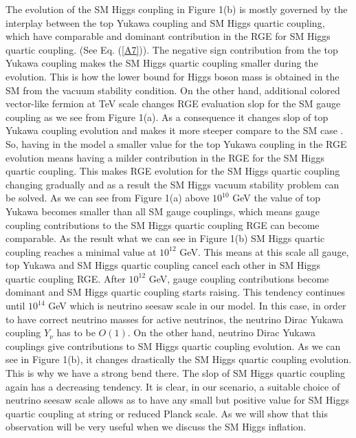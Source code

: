 \documentclass[aps,prd,preprint,superscriptaddress,showpacs,ctexart]{revtex4-1}
\begin{document}
The evolution of the SM Higgs coupling in Figure 1(b) is mostly governed
by the interplay between the top Yukawa coupling and SM Higgs quartic
coupling, which have comparable and dominant contribution in the RGE
for SM Higgs quartic coupling. (See Eq. (\ref{A7})). The negative
sign contribution from the top Yukawa coupling makes the SM Higgs quartic
coupling smaller during the evolution. This is how the lower bound
for Higgs boson mass is obtained in the SM from the vacuum stability
condition. On the other hand, additional colored vector-like fermion
at TeV scale changes RGE evaluation slop for the SM gauge coupling
as we see from Figure 1(a). As a consequence it changes slop of top
Yukawa coupling evolution and makes it more steeper compare to the
SM case \cite{Gogoladze:2010in}. So, having in the model a smaller
value for the top Yukawa coupling in the RGE evolution means having
a milder contribution in the RGE for the SM Higgs quartic coupling.
This makes RGE evolution for the SM Higgs quartic coupling 
changing gradually and as a result the SM Higgs vacuum stability problem
can be solved. As we can see from Figure 1(a) above $10^{10}$ GeV
the value of top Yukawa becomes smaller than all SM gauge couplings,
which means gauge coupling contributions to the SM Higgs quartic coupling
RGE can become comparable. As the result what we can see in Figure
1(b) SM Higgs quartic coupling reaches a minimal value at $10^{12}$
GeV. This means at this scale all gauge, top Yukawa and SM Higgs quartic
coupling cancel each other in SM Higgs quartic coupling RGE. After
$10^{12}$ GeV, gauge coupling contributions become dominant and SM
Higgs quartic coupling starts raising. This tendency continues until
$10^{14}$ GeV which is neutrino seesaw scale in our model. In this
case, in order to have correct neutrino masses for active neutrinos,
the neutrino Dirac Yukawa coupling $Y_{\nu}$ has to be $O(1)$. On
the other hand, neutrino Dirac Yukawa couplings give contributions
to SM Higgs quartic coupling evolution. As we can see in Figure
1(b), it changes drastically the SM Higgs quartic coupling evolution.
This is why we have a strong bend there. The slop of SM Higgs quartic
coupling again has a decreasing tendency. It is clear, in our scenario,
 a suitable choice of neutrino seesaw scale allows as to have any small
but positive value for SM Higgs quartic coupling at string or reduced
Planck scale. As we will show that this observation will be very useful
when we discuss the SM Higgs inflation.
 
\end{document}
